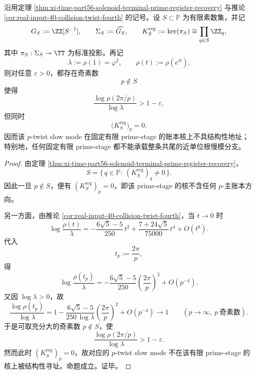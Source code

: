 \begin{theorem}\label{thm:xi-time-part9v-finite-primestage-nearunitroot-blindness}
沿用定理 \ref{thm:xi-time-part56-solenoid-terminal-prime-register-recovery} 与推论 \ref{cor:real-input-40-collision-twist-fourth} 的记号。设 \(S\subset\mathbb P\) 为有限素数集，并记
\[
G_S:=\ZZ[S^{-1}],
\qquad
\Sigma_S:=\widehat{G_S},
\qquad
K_S^{\mathrm{reg}}:=\ker(\pi_S)\cong\prod_{q\in S}\ZZ_q,
\]
其中 \(\pi_S:\Sigma_S\twoheadrightarrow\TT\) 为标准投影。再记
\[
\lambda:=\rho(1)=\varphi^2,
\qquad
\rho(t):=\rho(e^{it}).
\]
则对任意 \(\varepsilon>0\)，都存在奇素数
\[
p\notin S
\]
使得
\[
\frac{\log\rho(2\pi/p)}{\log\lambda}>1-\varepsilon,
\]
但同时
\[
\bigl(K_S^{\mathrm{reg}}\bigr)_p=0.
\]
因而该 \(p\)-twist slow mode 在固定有限 prime-stage 的账本核上不具结构性地址；特别地，任何固定有限 prime-stage 都不能承载整条共尾的近单位根慢模分支。
\end{theorem}
\begin{proof}
由定理 \ref{thm:xi-time-part56-solenoid-terminal-prime-register-recovery}，
\[
S=\{\,q\in\mathbb P:\ (K_S^{\mathrm{reg}})_q\neq 0\,\}.
\]
因此一旦 \(p\notin S\)，便有 \((K_S^{\mathrm{reg}})_p=0\)，即该 prime-stage 的核不含任何 \(p\)-主账本方向。

另一方面，由推论 \ref{cor:real-input-40-collision-twist-fourth}，当 \(t\to 0\) 时
\[
\log\frac{\rho(t)}{\lambda}
=
-\frac{6\sqrt5-5}{250}\,t^2
+\frac{7+24\sqrt5}{75000}\,t^4
+O(t^6).
\]
代入
\[
t_p:=\frac{2\pi}{p},
\]
得
\[
\log\frac{\rho(t_p)}{\lambda}
=
-\frac{6\sqrt5-5}{250}\left(\frac{2\pi}{p}\right)^2
+O(p^{-4}).
\]
又因 \(\log\lambda>0\)，故
\[
\frac{\log\rho(t_p)}{\log\lambda}
=
1-\frac{6\sqrt5-5}{250\,\log\lambda}\left(\frac{2\pi}{p}\right)^2
+O(p^{-4})
\longrightarrow 1
\qquad(p\to\infty,\ p\ \text{奇素数}).
\]
于是可取充分大的奇素数 \(p\notin S\)，使
\[
\frac{\log\rho(2\pi/p)}{\log\lambda}>1-\varepsilon.
\]
然而此时 \((K_S^{\mathrm{reg}})_p=0\)，故对应的 \(p\)-twist slow mode 不在该有限 prime-stage 的核上被结构性寻址。命题成立。证毕。
\end{proof}

